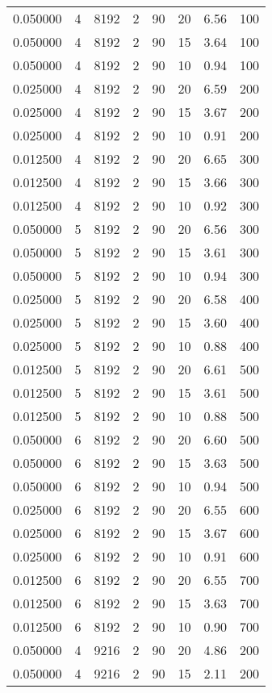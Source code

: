 \documentclass[12pt,letterpaper]{article}
\begin{document}
\begin{center}
\begin{longtable}{r|r|r|r|r|r|r|r}
0.050000 & 4 & 8192 & 2 & 90 & 20 & 6.56 & 100 \\
0.050000 & 4 & 8192 & 2 & 90 & 15 & 3.64 & 100 \\
0.050000 & 4 & 8192 & 2 & 90 & 10 & 0.94 & 100 \\
0.025000 & 4 & 8192 & 2 & 90 & 20 & 6.59 & 200 \\
0.025000 & 4 & 8192 & 2 & 90 & 15 & 3.67 & 200 \\
0.025000 & 4 & 8192 & 2 & 90 & 10 & 0.91 & 200 \\
0.012500 & 4 & 8192 & 2 & 90 & 20 & 6.65 & 300 \\
0.012500 & 4 & 8192 & 2 & 90 & 15 & 3.66 & 300 \\
0.012500 & 4 & 8192 & 2 & 90 & 10 & 0.92 & 300 \\
0.050000 & 5 & 8192 & 2 & 90 & 20 & 6.56 & 300 \\
0.050000 & 5 & 8192 & 2 & 90 & 15 & 3.61 & 300 \\
0.050000 & 5 & 8192 & 2 & 90 & 10 & 0.94 & 300 \\
0.025000 & 5 & 8192 & 2 & 90 & 20 & 6.58 & 400 \\
0.025000 & 5 & 8192 & 2 & 90 & 15 & 3.60 & 400 \\
0.025000 & 5 & 8192 & 2 & 90 & 10 & 0.88 & 400 \\
0.012500 & 5 & 8192 & 2 & 90 & 20 & 6.61 & 500 \\
0.012500 & 5 & 8192 & 2 & 90 & 15 & 3.61 & 500 \\
0.012500 & 5 & 8192 & 2 & 90 & 10 & 0.88 & 500 \\
0.050000 & 6 & 8192 & 2 & 90 & 20 & 6.60 & 500 \\
0.050000 & 6 & 8192 & 2 & 90 & 15 & 3.63 & 500 \\
0.050000 & 6 & 8192 & 2 & 90 & 10 & 0.94 & 500 \\
0.025000 & 6 & 8192 & 2 & 90 & 20 & 6.55 & 600 \\
0.025000 & 6 & 8192 & 2 & 90 & 15 & 3.67 & 600 \\
0.025000 & 6 & 8192 & 2 & 90 & 10 & 0.91 & 600 \\
0.012500 & 6 & 8192 & 2 & 90 & 20 & 6.55 & 700 \\
0.012500 & 6 & 8192 & 2 & 90 & 15 & 3.63 & 700 \\
0.012500 & 6 & 8192 & 2 & 90 & 10 & 0.90 & 700 \\
0.050000 & 4 & 9216 & 2 & 90 & 20 & 4.86 & 200 \\
0.050000 & 4 & 9216 & 2 & 90 & 15 & 2.11 & 200 \\

\end{longtable}
\end{center}
\end{document}

